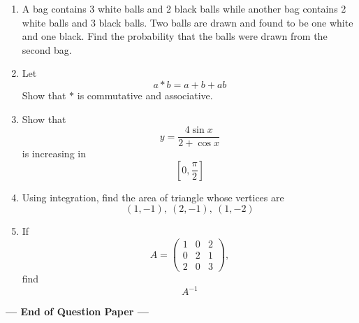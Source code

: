 \documentclass[12pt,a4paper]{article}
\begin{document}
\begin{enumerate}[label=\textbf{Q\arabic*.}]
\item A bag contains 3 white balls and 2 black balls while another bag contains 2 white balls and 3 black balls. Two balls are drawn and found to be one white and one black. Find the probability that the balls were drawn from the second bag.

\item Let
\[
a*b=a+b+ab
\]
Show that $*$ is commutative and associative.

\item Show that
\[
y=\frac{4\sin x}{2+\cos x}
\]
is increasing in
\[
\left[0,\frac{\pi}{2}\right]
\]

\item Using integration, find the area of triangle whose vertices are
\[
(1,-1),\ (2,-1),\ (1,-2)
\]

\item If
\[
A=
\begin{pmatrix}
1 & 0 & 2\\
0 & 2 & 1\\
2 & 0 & 3
\end{pmatrix},
\]
find
\[
A^{-1}
\]

\end{enumerate}

\vspace{1cm}

\begin{center}
    \Large \textbf{--- End of Question Paper ---}
\end{center}
\end{document}
